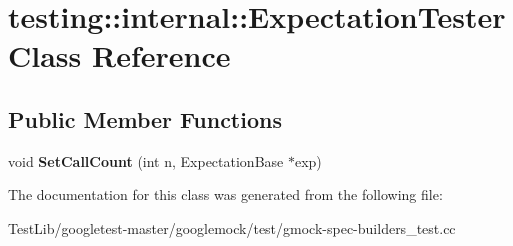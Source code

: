 \hypertarget{classtesting_1_1internal_1_1ExpectationTester}{}\section{testing\+:\+:internal\+:\+:Expectation\+Tester Class Reference}
\label{classtesting_1_1internal_1_1ExpectationTester}
\subsection*{Public Member Functions}
\begin{DoxyCompactItemize}
\item 
\mbox{\label{classtesting_1_1internal_1_1ExpectationTester_af5d762355ef83f414c4b0fc14c8fc943}} 
void {\bfseries Set\+Call\+Count} (int n, Expectation\+Base $\ast$exp)
\end{DoxyCompactItemize}


The documentation for this class was generated from the following file\+:\begin{DoxyCompactItemize}
\item 
Test\+Lib/googletest-\/master/googlemock/test/gmock-\/spec-\/builders\+\_\+test.\+cc\end{DoxyCompactItemize}
